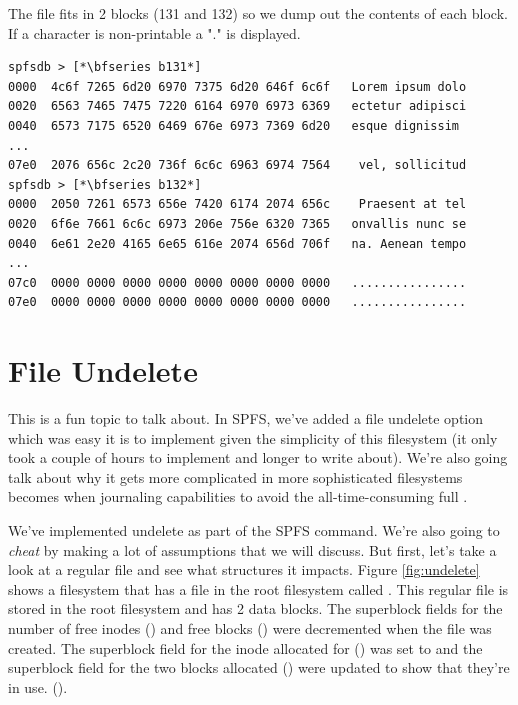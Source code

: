 \noindent
The file fits in 2 blocks (131 and 132) so we dump out the contents of each block. If a character is non-printable a "." is displayed. 

\begin{lstlisting}
spfsdb > [*\bfseries b131*]
0000  4c6f 7265 6d20 6970 7375 6d20 646f 6c6f   Lorem ipsum dolo
0020  6563 7465 7475 7220 6164 6970 6973 6369   ectetur adipisci
0040  6573 7175 6520 6469 676e 6973 7369 6d20   esque dignissim 
...
07e0  2076 656c 2c20 736f 6c6c 6963 6974 7564    vel, sollicitud
spfsdb > [*\bfseries b132*]
0000  2050 7261 6573 656e 7420 6174 2074 656c    Praesent at tel
0020  6f6e 7661 6c6c 6973 206e 756e 6320 7365   onvallis nunc se
0040  6e61 2e20 4165 6e65 616e 2074 656d 706f   na. Aenean tempo
...
07c0  0000 0000 0000 0000 0000 0000 0000 0000   ................
07e0  0000 0000 0000 0000 0000 0000 0000 0000   ................
\end{lstlisting}


\section{File Undelete}

This is a fun topic to talk about. In SPFS, we've added a file undelete option which was easy it is to implement given the simplicity of this filesystem (it only took a couple of hours to implement and longer to write about). We're  also going talk about why it gets more complicated in more sophisticated filesystems becomes when journaling capabilities to avoid the all-time-consuming full . 

We've implemented undelete as part of the SPFS  command. We're also going to \textit{cheat} by making a lot of assumptions that we will discuss. But first, let's take a look at a regular file and see what structures it impacts. Figure \ref{fig:undelete} shows a filesystem that has a file in the root filesystem called . This regular file is stored in the root filesystem and has 2 data blocks. The superblock fields for the number of free inodes () and free blocks () were decremented when the file was created. The superblock field for the inode allocated for   () was set to  and the superblock field for the two blocks allocated () were updated to show that they're in use. ().

